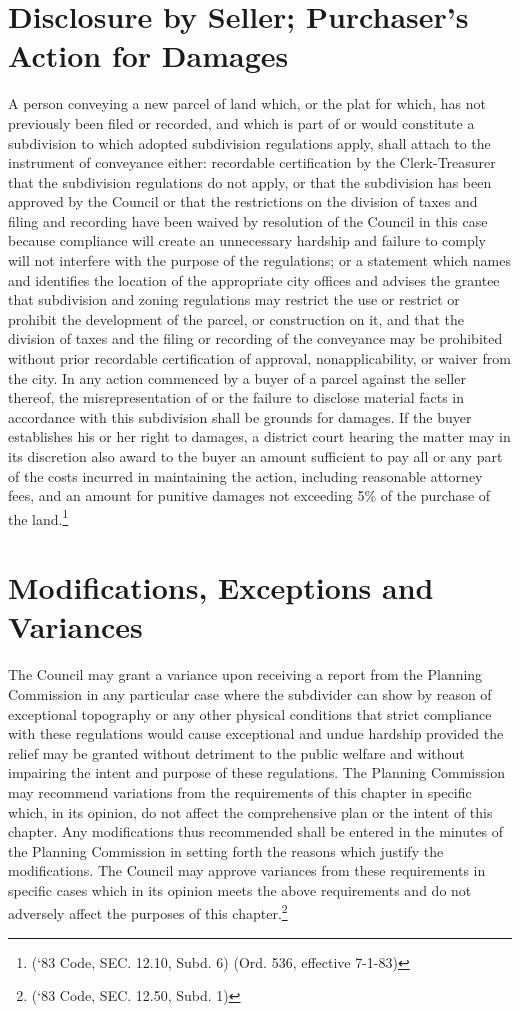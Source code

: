 \section{Disclosure by Seller; Purchaser’s Action for Damages}
A person conveying a new parcel of land which, or the plat for which, has not previously been filed or recorded, and which is part of or would constitute a subdivision to which adopted subdivision regulations apply, shall attach to the instrument of conveyance either: recordable certification by the Clerk-Treasurer that the subdivision regulations do not apply, or that the subdivision has been approved by the Council or that the restrictions on the division of taxes and filing and recording have been waived by resolution of the Council in this case because compliance will create an unnecessary hardship and failure to comply will not interfere with the purpose of the regulations; or a statement which names and identifies the location of the appropriate city offices and advises the grantee that subdivision and zoning regulations may restrict the use or restrict or prohibit the development of the parcel, or construction on it, and that the division of taxes and the filing or recording of the conveyance may be prohibited without prior recordable certification of approval, nonapplicability, or waiver from the city. In any action commenced by a buyer of a parcel against the seller thereof, the misrepresentation of or the failure to disclose material facts in accordance with this subdivision shall be grounds for damages.  If the buyer establishes his or her right to damages, a district court hearing the matter may in its discretion also award to the buyer an amount sufficient to pay all or any part of the costs incurred in maintaining the action, including reasonable attorney fees, and an amount for punitive damages not exceeding 5\% of the purchase of the land.\footnote{(‘83 Code, SEC. 12.10, Subd. 6)  (Ord. 536, effective 7-1-83)}
\section{Modifications, Exceptions and Variances}
The Council may grant a variance upon receiving a report from the Planning Commission in any particular case where the subdivider can show by reason of exceptional topography or any other physical conditions that strict compliance with these regulations would cause exceptional and undue hardship provided the relief may be granted without detriment to the public welfare and without impairing the intent and purpose of these regulations. The Planning Commission may recommend variations from the requirements of this chapter in specific which, in its opinion, do not affect the comprehensive plan or the intent of this chapter.  Any modifications thus recommended shall be entered in the minutes of the Planning Commission in setting forth the reasons which justify the modifications.  The Council may approve variances from these requirements in specific cases which in its opinion meets the above requirements and do not adversely affect the purposes of this chapter.\footnote{(‘83 Code, SEC. 12.50, Subd. 1)}
